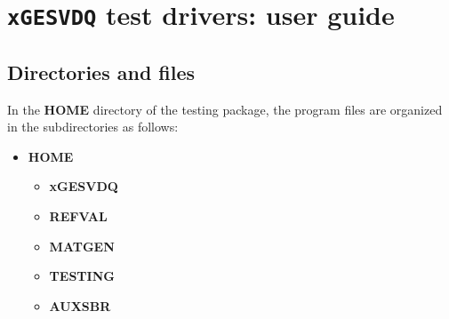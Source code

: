 \documentclass[12pt, a4paper, final]{article}
\numberwithin{equation}{section}
\begin{document}
\section{\texttt{xGESVDQ} test drivers: user guide}\label{S=test}


\subsection{Directories and files}\label{SS=DIF}

In the \textbf{HOME} directory of the testing package, the program files
are organized in the subdirectories as follows:
\begin{itemize}
\item \textbf{HOME} 
\begin{itemize}
\item \textbf{xGESVDQ}
\item \textbf{REFVAL}
\item \textbf{MATGEN}
\item \textbf{TESTING}
\item \textbf{AUXSBR}	
\end{itemize}	
\end{itemize}
\end{document}
